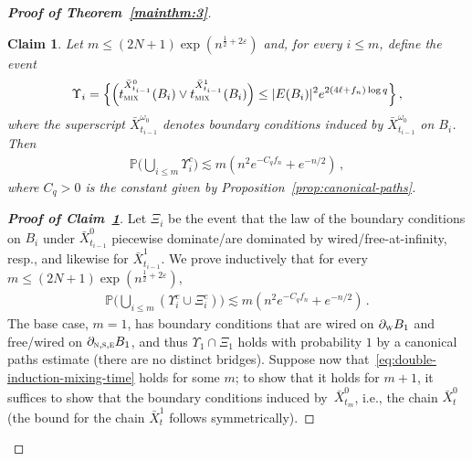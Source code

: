 \documentclass[reqno,11pt]{amsart}
\numberwithin{equation}{section}
\renewcommand{\epsilon}{\varepsilon}
\newtheorem{claim}[theorem]{Claim}
\theoremstyle{definition}{
\newtheorem{example}[theorem]{Example}
\newtheorem{definition}[theorem]{Definition}
\newtheorem*{definition*}{Definition}
\newtheorem{problem}[theorem]{Problem}
\newtheorem{question}[theorem]{Question}
\newtheorem{remark}[theorem]{Remark}
}
\renewcommand{\epsilon}{\varepsilon}
\newcommand{\tmix}{t_{\textsc{mix}}}
\newcommand{\north}{{\textsc{n}}}
\newcommand{\south}{{\textsc{s}}}
\newcommand{\east}{{\textsc{e}}}
\newcommand{\west}{{\textsc{w}}}
\begin{document}
\begin{proof}[\textbf{\emph{Proof of Theorem~\ref{mainthm:3}}}]
\begin{claim}\label{claim:uniform-mixing-time-bound}
Let $m\leq (2N+1)\exp(n^{\frac 12 +2\epsilon})$ and, for every $i\leq m$, define the event
\begin{equation}
	\label{eq:unif-mixing-time-event}
	\Upsilon_i = \Big\{ \Big(\tmix^{\bar X_{t_{i-1}}^{0}} (B_{i})\vee \tmix^{\bar X_{t_{i-1}}^{1}} (B_{i})\Big)\leq |E(B_i)|^2 e^{2(4\ell +f_n )\log q}\Big\} \,,
\end{equation}
where the superscript ${\bar X_{t_{i-1}}^{\omega_0}}$ denotes boundary conditions induced by $\bar X_{t_{i-1}}^{\omega_0}$ on $B_i$.
Then
\begin{align}\label{eq:induction-uniform-mixing-time}
\mathbb P \Big(\bigcup_{i\leq m} \Upsilon^c_i\Big)\lesssim m ( n^2  e^{-C_q f_n}+e^{-n/2})\,,
\end{align}
where $C_q>0$ is the constant given by Proposition~\ref{prop:canonical-paths}. 
\end{claim} 
\begin{proof}[\textbf{\emph{Proof of Claim~\ref{claim:uniform-mixing-time-bound}}}]
Let $\Xi_i$ be the event that the law of the boundary conditions on $B_i$ under $\bar X_{t_{i-1}}^{0}$ piecewise dominate/are dominated by wired/free-at-infinity, resp., and likewise for $\bar X_{t_{i-1}}^{1}$. We prove inductively that for every $m\leq (2N+1)\exp(n^{\frac 12 +2\epsilon})$, 
\begin{align}\label{eq:double-induction-mixing-time}
\mathbb P \bigg(\bigcup_{i\leq m} (\Upsilon_i^c \cup \Xi_i^c)\bigg) \lesssim m(n^2 e^{-C_q f_n}+e^{-n/2})\,.
\end{align}
The base case, $m=1$, has boundary conditions that are wired on $\partial_\west B_1$ and free/wired on $\partial_{\north,\south,\east} B_1$, and thus $\Upsilon_1 \cap \Xi_1$ holds with probability $1$ by a canonical paths estimate (there are no distinct bridges). Suppose now that~\eqref{eq:double-induction-mixing-time} holds for some $m$; to show that it holds for $m+1$, it suffices to show that the boundary conditions induced by~$\bar X_{t_{m}}^0$, i.e., the chain $\bar X_t^0$ (the bound for the chain $\bar X_t^1$ follows symmetrically).


\end{proof}
\end{proof}
\end{document}
